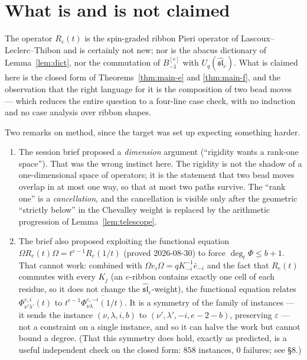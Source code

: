 \documentclass[11pt]{article}
\theoremstyle{plain}
\theoremstyle{definition}
\begin{document}
\section{What is and is not claimed}

The operator $R_e(t)$ is the spin-graded ribbon Pieri operator of
Lascoux--Leclerc--Thibon and is certainly not new; nor is the abacus dictionary of
Lemma~\ref{lem:dict}, nor the commutation of $B^{[e]}_{-1}$ with
$U_q(\widehat{\mathfrak{sl}}_e)$. What is claimed here is the closed form of
Theorems~\ref{thm:main-e} and \ref{thm:main-f}, and the observation that the
right language for it is the composition of two bead moves --- which reduces the
entire question to a four-line case check, with no induction and no case analysis
over ribbon shapes.

Two remarks on method, since the target was set up expecting something harder.
\begin{enumerate}
\item The session brief proposed a \emph{dimension} argument (``rigidity wants a
rank-one space''). That was the wrong instinct here. The rigidity is not the
shadow of a one-dimensional space of operators; it is the statement that two bead
moves overlap in at most one way, so that at most two paths survive.
The ``rank one'' is a \emph{cancellation}, and the cancellation is visible only
after the geometric ``strictly below'' in the Chevalley weight is replaced by the
arithmetic progression of Lemma~\ref{lem:telescope}.
\item The brief also proposed exploiting the functional equation
$\Omega R_e(t)\Omega=t^{e-1}R_e(1/t)$ (proved 2026-08-30) to force
$\deg_t\Phi\le b+1$. That cannot work: combined with
$\Omega e_i\Omega=qK_{-i}^{-1}\bar e_{-i}$ and the fact that $R_e(t)$ commutes with
every $K_j$ (an $e$-ribbon contains exactly one cell of each residue, so it does not
change the $\widehat{\mathfrak{sl}}_e$-weight), the functional equation relates
$\Phi^{e,i}_{\nu'\lambda'}(t)$ to $t^{e-1}\overline{\Phi^{e,-i}_{\nu\lambda}(1/t)}$.
It is a symmetry of the family of instances --- it sends the instance
$(\nu,\lambda,i,b)$ to $(\nu',\lambda',-i,e-2-b)$, preserving $\varepsilon$ ---
not a constraint on a single instance, and so it can halve the work but cannot
bound a degree. (That this symmetry does hold, exactly as predicted, is a useful
independent check on the closed form: $858$ instances, $0$ failures; see \S8.)
\end{enumerate}
\end{document}
